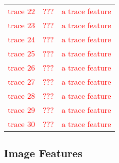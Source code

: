 \documentclass[10pt]{article}
\newcommand{\todo}[1]{\textcolor{red}{#1}}
\begin{document}
\begin{table}[h]
\begin{tabular}{lll}
    \todo{trace 22} & \todo{???} &  \todo{a trace feature} \\
    \addlinespace[2pt]
    \todo{trace 23} & \todo{???} &  \todo{a trace feature} \\
    \addlinespace[2pt]
    \todo{trace 24} & \todo{???} &  \todo{a trace feature} \\
    \addlinespace[2pt]
    \todo{trace 25} & \todo{???} &  \todo{a trace feature} \\
    \addlinespace[2pt]
    \todo{trace 26} & \todo{???} &  \todo{a trace feature} \\
    \addlinespace[2pt]
    \todo{trace 27} & \todo{???} &  \todo{a trace feature} \\
    \addlinespace[2pt]
    \todo{trace 28} & \todo{???} &  \todo{a trace feature} \\
    \addlinespace[2pt]
    \todo{trace 29} & \todo{???} &  \todo{a trace feature} \\
    \addlinespace[2pt]
    \todo{trace 30} & \todo{???} &  \todo{a trace feature} \\

    \bottomrule
  \end{tabular}
\end{table}

\subsection{Image Features}

\end{document}
